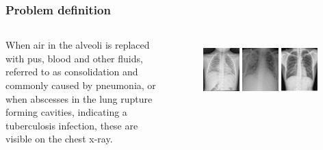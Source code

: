 \documentclass[8pt]{beamer}
\begin{document}
\begin{frame}
  \frametitle{Problem definition}

  \begin{columns}

     When air in the alveoli is replaced with pus, blood
    and other fluids, referred to as consolidation and commonly caused by
    pneumonia, or when abscesses in the lung rupture forming cavities,
    indicating a tuberculosis infection, these are visible on the chest x-ray.\\
    \pause

    \begin{figure}
      \includegraphics[width=0.3\textwidth]{images/normal1}\hspace{0.01\textwidth}%
      \includegraphics[width=0.3\textwidth]{images/consolidation_original}\hspace{0.01\textwidth}%
      \includegraphics[width=0.3\textwidth]{images/TB_original}\\[0.01\textwidth]

\end{figure}
\end{columns}
\end{frame}
\end{document}
